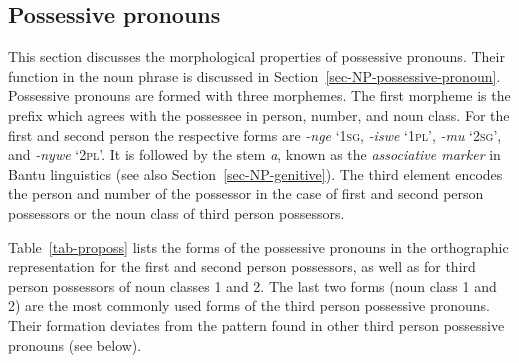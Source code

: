 \z


\subsection{Possessive pronouns}\label{sec-morph-posspro}

This section discusses the morphological properties of  possessive pronouns. 
Their function in the noun phrase is discussed in Section~\ref{sec-NP-possessive-pronoun}. 
Possessive pronouns are formed with three morphemes. 
The first morpheme is the prefix which agrees with the possessee in person, number, and noun class. 
For the first and second person the respective forms are \textit{-nge} `1\textsc{sg}, \textit{-iswe} `1\textsc{pl}', \textit{-mu} `2\textsc{sg}', and \textit{-nywe} `2\textsc{pl}'. 
It is followed by the stem \textit{a}, known as the \textit{associative marker} in Bantu linguistics (see also Section~\ref{sec-NP-genitive}). 
The third element encodes the person and number of the possessor in the case of first and second person possessors or the noun class of third person possessors. 

Table~\ref{tab-proposs} lists the forms of the possessive pronouns in the orthographic representation for the first and second person possessors, as well as for third person possessors of noun classes 1 and 2. 
The last two forms (noun class 1 and 2) are the most commonly used forms of the third person possessive pronouns. 
Their formation deviates from the pattern found in other third person possessive pronouns (see below). 

